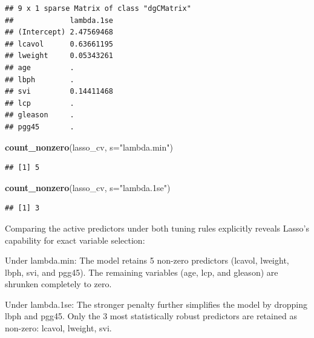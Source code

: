 \documentclass[
]{article}
\newenvironment{Shaded}{\begin{snugshade}}{\end{snugshade}}
\newcommand{\AttributeTok}[1]{\textcolor[rgb]{0.13,0.29,0.53}{#1}}
\newcommand{\FunctionTok}[1]{\textcolor[rgb]{0.13,0.29,0.53}{\textbf{#1}}}
\newcommand{\NormalTok}[1]{#1}
\newcommand{\SpecialCharTok}[1]{\textcolor[rgb]{0.81,0.36,0.00}{\textbf{#1}}}
\newcommand{\StringTok}[1]{\textcolor[rgb]{0.31,0.60,0.02}{#1}}
\begin{document}
\begin{verbatim}
## 9 x 1 sparse Matrix of class "dgCMatrix"
##             lambda.1se
## (Intercept) 2.47569468
## lcavol      0.63661195
## lweight     0.05343261
## age         .         
## lbph        .         
## svi         0.14411468
## lcp         .         
## gleason     .         
## pgg45       .
\end{verbatim}

\begin{Shaded}
\begin{Highlighting}[]
\FunctionTok{count\_nonzero}\NormalTok{(lasso\_cv, }\AttributeTok{s=}\StringTok{"lambda.min"}\NormalTok{)}
\end{Highlighting}
\end{Shaded}

\begin{verbatim}
## [1] 5
\end{verbatim}

\begin{Shaded}
\begin{Highlighting}[]
\FunctionTok{count\_nonzero}\NormalTok{(lasso\_cv, }\AttributeTok{s=}\StringTok{"lambda.1se"}\NormalTok{)}
\end{Highlighting}
\end{Shaded}

\begin{verbatim}
## [1] 3
\end{verbatim}

Comparing the active predictors under both tuning rules explicitly
reveals Lasso's capability for exact variable selection:

Under lambda.min: The model retains 5 non-zero predictors (lcavol,
lweight, lbph, svi, and pgg45). The remaining variables (age, lcp, and
gleason) are shrunken completely to zero.

Under lambda.1se: The stronger penalty further simplifies the model by
dropping lbph and pgg45. Only the 3 most statistically robust predictors
are retained as non-zero: lcavol, lweight, svi.

\begin{Shaded}
\end{Shaded}
\end{document}
